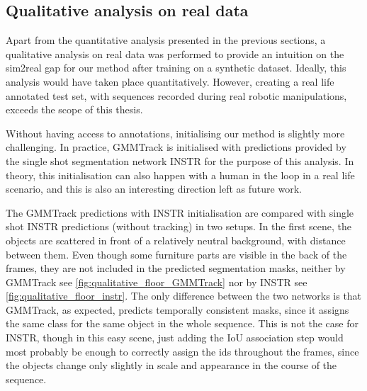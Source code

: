 \subsection{Qualitative analysis on real data}

Apart from the quantitative analysis presented in the previous sections, a qualitative analysis on real data was performed to provide an intuition on the sim2real gap for our method after training on a synthetic dataset. Ideally, this analysis would have taken place quantitatively. However, creating a real life annotated test set, with sequences recorded during real robotic manipulations, exceeds the scope of this thesis. \par
\newpage
Without having access to annotations, initialising our method is slightly more challenging. In practice, GMMTrack is initialised with predictions provided by the single shot segmentation network INSTR for the purpose of this analysis. In theory, this initialisation can also happen with a human in the loop in a real life scenario, and this is also an interesting direction left as future work. \par

The GMMTrack predictions with INSTR initialisation are compared with single shot INSTR predictions (without tracking) in two setups. In the first scene, the objects are scattered in front of a relatively neutral background, with distance between them. Even though some furniture parts are visible in the back of the frames, they are not included in the predicted segmentation masks, neither by GMMTrack see \figref\ref{fig:qualitative_floor_GMMTrack} nor by INSTR see \figref\ref{fig:qualitative_floor_instr}. The only difference between the two networks is that GMMTrack, as expected, predicts temporally consistent masks, since it assigns the same class for the same object in the whole sequence. This is not the case for INSTR, though in this easy scene, just adding the IoU association step would most probably be enough to correctly assign the ids throughout the frames, since the objects change only slightly in scale and appearance in the course of the sequence. \par

